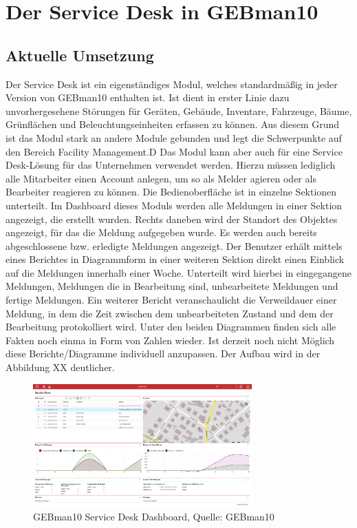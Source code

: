 
\section{Der Service Desk in GEBman10}

\subsection{Aktuelle Umsetzung}
\noindent
Der Service Desk  ist ein eigenständiges Modul, welches standardmäßig in jeder Version von GEBman10 enthalten ist. Ist dient in erster Linie dazu unvorhergesehene Störungen für Geräten, Gebäude, Inventare, Fahrzeuge, Bäume, Grünflächen und Beleuchtungseinheiten erfassen zu können. Aus diesem Grund ist das Modul stark an andere Module gebunden und legt die Schwerpunkte auf den Bereich Facility Management.D Das Modul kann aber auch für eine Service Desk-Lösung für das Unternehmen verwendet werden. Hierzu müssen lediglich alle Mitarbeiter einen Account anlegen, um so als Melder agieren oder als Bearbeiter reagieren zu können. \newline 
Die Bedienoberfläche ist in einzelne Sektionen unterteilt. Im Dashboard dieses Moduls werden alle Meldungen in einer Sektion angezeigt, die erstellt wurden. Rechts daneben wird der Standort des Objektes angezeigt, für das die Meldung aufgegeben wurde. Es werden auch bereits abgeschlossene bzw. erledigte Meldungen angezeigt. Der Benutzer erhält mittels eines Berichtes in Diagrammform in einer weiteren Sektion direkt einen Einblick auf die Meldungen innerhalb einer Woche. Unterteilt wird hierbei in eingegangene Meldungen, Meldungen die in Bearbeitung sind, unbearbeitete Meldungen und fertige Meldungen. Ein weiterer Bericht veranschaulicht die Verweildauer einer Meldung, in dem die Zeit zwischen dem unbearbeiteten Zustand und dem der Bearbeitung protokolliert wird. Unter den beiden Diagrammen finden sich alle Fakten noch einma in Form von Zahlen wieder. Ist derzeit noch nicht Möglich diese Berichte/Diagramme individuell anzupassen. Der Aufbau wird in der Abbildung XX deutlicher. 

\begin{figure}[h!]
\centering
	\includegraphics[width=0.75\textwidth]{Abbildungen/GEBman.png}
	\caption[GEBman10 Service Desk Dashboard]{GEBman10 Service Desk Dashboard, Quelle: 
	GEBman10}
	\label{fig:GEBman10 Service Desk Dashboard}
\end{figure}

